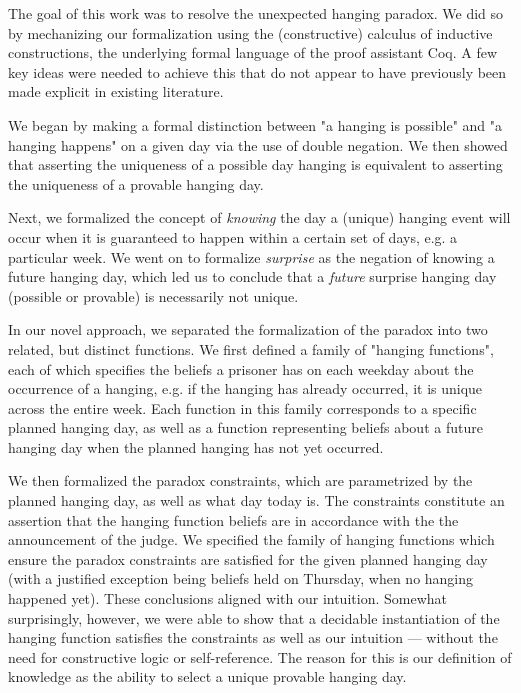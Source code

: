 \documentclass[runningheads]{llncs}
\begin{document}
The goal of this work was to resolve the unexpected hanging paradox. We
did so by mechanizing our formalization
using the (constructive) calculus of inductive constructions, the underlying
formal language of the proof assistant Coq. A few key ideas were needed to
achieve this that do not appear to have previously been made explicit in existing
literature.

We began by making a formal distinction between "a hanging is possible" and "a hanging
happens" on a given day via the use of double negation. We then showed that
asserting the uniqueness of a possible day hanging is equivalent to asserting the uniqueness of a provable hanging day.

Next, we formalized the concept of \emph{knowing} the day a (unique) hanging event will occur
when it is guaranteed to happen within a certain set of days, e.g. a particular week.
We went on to formalize \emph{surprise} as the negation of
knowing a future hanging day, which led us to conclude that a \emph{future} surprise
hanging day (possible or provable) is necessarily not unique.

In our novel approach, we separated the formalization of the paradox into two related,
but distinct functions. We first defined a family of "hanging functions",
each of which specifies the beliefs a prisoner has on each weekday about the occurrence
of a hanging, e.g. if the hanging has already occurred, it is
unique across the entire week. Each function in this family corresponds to
a specific planned hanging day, as well as a function representing beliefs about a future
hanging day when the planned hanging has not yet occurred.

We then formalized the paradox constraints, which are parametrized by the planned
hanging day, as
well as what day today is. The constraints constitute an assertion that
the hanging function beliefs are in accordance with the the announcement of the judge.
We specified the family of hanging functions which ensure the paradox constraints
are satisfied for the given planned hanging day (with a justified exception being beliefs
held on Thursday, when no hanging happened yet). These conclusions aligned with our
intuition. Somewhat surprisingly, however, we were able to show that a decidable
instantiation of the hanging function satisfies the constraints as well as
our intuition --- without the need for constructive logic or self-reference.
The reason for this is our definition of knowledge as the ability to select
a unique provable hanging day.
\end{document}
